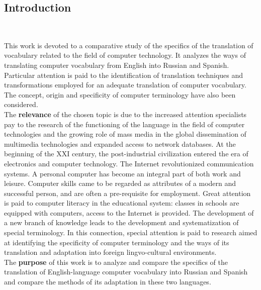 \documentclass[12pt, a4paper, twoside]{report}
\begin{document}
\newpage
\begin{center}
\tableofcontents 
\end{center}
\thispagestyle{empty}

\newpage
\begin{center}
    \section*{Introduction}\\
\end{center}

This work is devoted to a comparative study of the specifics of the translation of vocabulary related to the field of computer technology. It analyzes the ways of translating computer vocabulary from English into Russian and Spanish. Particular attention is paid to the identification of translation techniques and transformations employed for an adequate translation of computer vocabulary. The concept, origin and specificity of computer terminology have also been considered.\\

The \textbf{relevance} of the chosen topic is due to the increased attention specialists pay to the research of the functioning of the language in the field of computer technologies and the growing role of mass media in the global dissemination of multimedia technologies and expanded access to network databases. At the begin\-ning of the XXI century, the post-industrial civilization entered the era of electro\-nics and computer technology. The Internet revolutionized communication systems. A personal computer has become an integral part of both work and leisure. Compu\-ter skills came to be regarded as attributes of a modern and successful person, and are often a pre-requisite for employment. Great attention is paid to computer literacy in the educational system: classes in schools are equipped with computers, access to the Internet is provided. The development of a new branch of knowledge leads to the development and systematization of special terminology. In this connec\-tion, special attention is paid to research aimed at identifying the specificity of computer terminology and the ways of its translation and adaptation into foreign lingvo-cultural environments.\\

The \textbf{purpose} of this work is to analyze and compare the specifics of the translation of English-language computer vocabulary into Russian and Spanish and compare the methods of its adaptation in these two languages.\\
\end{document}
